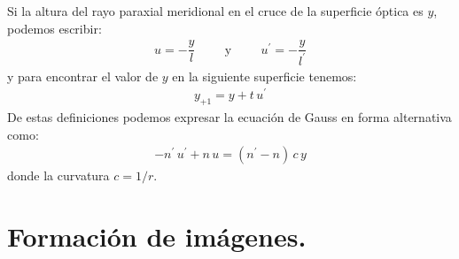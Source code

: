 \documentclass[14pt]{extarticle}
\begin{document}
Si la altura del rayo paraxial meridional en el cruce de la superficie óptica es $y$, podemos escribir:
\begin{align}
u = - \dfrac{y}{l} \hspace{1cm} \text{y} \hspace{1cm} u^{\prime} = - \dfrac{y}{l^{\prime}}
\label{eq:ecuacion_I_35}
\end{align}
y para encontrar el valor de $y$ en la siguiente superficie tenemos:
\begin{align}
y_{+1} = y + t \, u^{\prime}
\label{eq:ecuacion_I_36}
\end{align}
De estas definiciones podemos expresar la ecuación de Gauss en forma alternativa como:
\begin{align}
- n^{\prime} \, u^{\prime} + n \, u = (n^{\prime} - n) \, c \, y
\label{eq:ecuacion_I_37} 
\end{align}
donde la curvatura $c = 1/r$.

\section{Formación de imágenes.}
\end{document}
